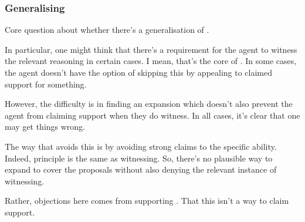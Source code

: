 




\newpage


\subsubsection{Generalising \nI{}}
\label{sec:generalising-ni}

\begin{note}
  Core question about whether there's a generalisation of \nI{}.

  In particular, one might think that there's a requirement for the agent to witness the relevant reasoning in certain cases.
  I mean, that's the core of \nI{}.
  In some cases, the agent doesn't have the option of skipping this by appealing to claimed support for something.

  However, the difficulty is in finding an expansion which doesn't also prevent the agent from claiming support when they do witness.
  In all cases, it's clear that one may get things wrong.

  The way that \ur{} avoids this is by avoiding strong claims to the specific ability.
  Indeed, principle is the same as witnessing.
  So, there's no plausible way to expand \nI{} to cover the proposals without also denying the relevant instance of witnessing.

  Rather, objections here comes from supporting \ESU{}.
  That this isn't a way to claim support.
\end{note}

